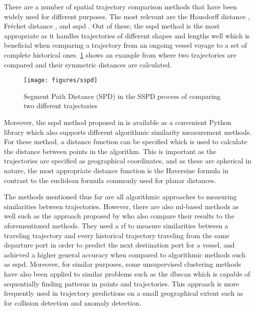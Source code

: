 There are a number of spatial trajectory comparison methods that have been widely used for different purposes. The most relevant are the Hausdorff distance \parencite{magdy2015}, Fréchet distance \parencite{magdy2015}, and \acrfull{sspd} \parencite{besse2015review}. Out of these, the \acrshort{sspd} method is the most appropriate as it handles trajectories of different shapes and lengths well which is beneficial when comparing a trajectory from an ongoing vessel voyage to a set of complete historical ones. \cref{fig:sspd} shows an example from \cite{besse2015review} where two trajectories are compared and their symmetric distances are calculated.

\begin{figure}[htbp]  %
    \centering
    \texttt{[image: figures/sspd]}
    \caption{Segment Path Distance (SPD) in the SSPD process of comparing two different trajectories \parencite{besse2015review}}
    \label{fig:sspd}
\end{figure}

Moreover, the \acrshort{sspd} method proposed in \cite{besse2015review} is available as a convenient Python library which also supports different algorithmic similarity measurement methods. For these method, a distance function can be specified which is used to calculate the distance between points in the algorithm. This is important as the trajectories are specified as geographical coordinates, and as these are spherical in nature, the most appropriate distance function is the Haversine \parencite{haversine} formula in contrast to the euclidean formula commonly used for planar distances.

The methods mentioned thus far are all algorithmic approaches to measuring similarities between trajectories. However, there are also \acrshort{ml}-based methods as well such as the approach proposed by \cite{Zhang2020AISApproach} who also compare their results to the aforementioned methods. They used a \acrfull{rf} to measure similarities between a traveling trajectory and every historical trajectory traveling from the same departure port in order to predict the next destination port for a vessel, and achieved a higher general accuracy when compared to algorithmic methods such as \acrshort{sspd}. Moreover, for similar purposes, some unsupervised clustering methods have also been applied to similar problems such as the \acrfull{dbscan} \parencite{dbscan} which is capable of sequentially finding patterns in points and trajectories. This approach is more frequently used in trajectory predictions on a small geographical extent such as for collision detection and anomaly detection.

